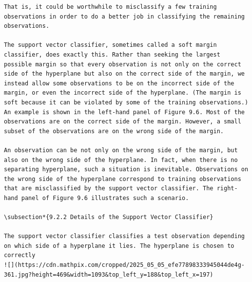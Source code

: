 \documentclass[10pt]{article}
\begin{document}
\begin{verbatim}
That is, it could be worthwhile to misclassify a few training observations in order to do a better job in classifying the remaining observations.

The support vector classifier, sometimes called a soft margin classifier, does exactly this. Rather than seeking the largest possible margin so that every observation is not only on the correct side of the hyperplane but also on the correct side of the margin, we instead allow some observations to be on the incorrect side of the margin, or even the incorrect side of the hyperplane. (The margin is soft because it can be violated by some of the training observations.) An example is shown in the left-hand panel of Figure 9.6. Most of the observations are on the correct side of the margin. However, a small subset of the observations are on the wrong side of the margin.

An observation can be not only on the wrong side of the margin, but also on the wrong side of the hyperplane. In fact, when there is no separating hyperplane, such a situation is inevitable. Observations on the wrong side of the hyperplane correspond to training observations that are misclassified by the support vector classifier. The right-hand panel of Figure 9.6 illustrates such a scenario.

\subsection*{9.2.2 Details of the Support Vector Classifier}

The support vector classifier classifies a test observation depending on which side of a hyperplane it lies. The hyperplane is chosen to correctly
![](https://cdn.mathpix.com/cropped/2025_05_05_efe77898333945044de4g-361.jpg?height=469&width=1093&top_left_y=188&top_left_x=197)


\end{verbatim}
\end{document}
